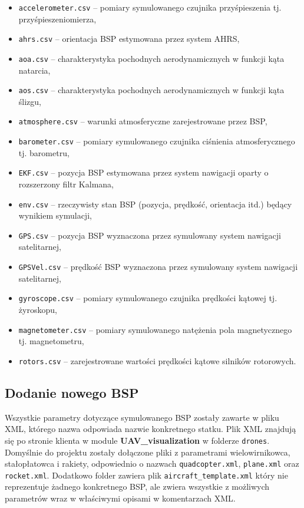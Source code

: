  \begin{itemize}[noitemsep]
\item \texttt{accelerometer.csv} -- pomiary symulowanego czujnika przyśpieszenia tj. przyśpieszeniomierza,
\item \texttt{ahrs.csv} -- orientacja BSP estymowana przez system AHRS,
\item \texttt{aoa.csv} -- charakterystyka pochodnych aerodynamicznych w funkcji kąta natarcia,
\item \texttt{aos.csv} -- charakterystyka pochodnych aerodynamicznych w funkcji kąta ślizgu,
\item \texttt{atmosphere.csv} -- warunki atmosferyczne zarejestrowane przez BSP,
\item \texttt{barometer.csv} -- pomiary symulowanego czujnika ciśnienia atmosferycznego tj. barometru,
\item \texttt{EKF.csv} -- pozycja BSP estymowana przez system nawigacji oparty o rozszerzony filtr Kalmana,
\item \texttt{env.csv} -- rzeczywisty stan BSP (pozycja, prędkość, orientacja itd.) będący wynikiem symulacji,
\item \texttt{GPS.csv} -- pozycja BSP wyznaczona przez symulowany system nawigacji satelitarnej,
\item \texttt{GPSVel.csv} -- prędkość BSP wyznaczona przez symulowany system nawigacji satelitarnej,
\item \texttt{gyroscope.csv} -- pomiary symulowanego czujnika prędkości kątowej tj. żyroskopu,
\item \texttt{magnetometer.csv} -- pomiary symulowanego natężenia pola magnetycznego tj. magnetometru,
\item \texttt{rotors.csv} -- zarejestrowane wartości prędkości kątowe silników rotorowych.
\end{itemize}



\subsection{Dodanie nowego BSP}

Wszystkie parametry dotyczące symulowanego BSP zostały zawarte w pliku XML, którego nazwa odpowiada nazwie konkretnego statku. Plik XML znajdują się po stronie klienta w module \textbf{UAV\_visualization} w folderze \texttt{drones}. Domyślnie do projektu zostały dołączone pliki z parametrami wielowirnikowca, stałopłatowca i rakiety, odpowiednio o nazwach \texttt{quadcopter.xml}, \texttt{plane.xml} oraz \texttt{rocket.xml}. Dodatkowo folder zawiera plik \texttt{aircraft\_template.xml} który nie reprezentuje żadnego konkretnego BSP, ale zwiera wszystkie z możliwych parametrów wraz w właściwymi opisami w komentarzach XML.\\

